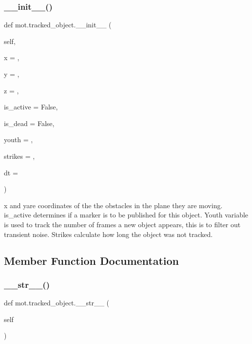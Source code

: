 \subsubsection{\texorpdfstring{\+\_\+\+\_\+init\+\_\+\+\_\+()}{\_\_init\_\_()}}
{\footnotesize\ttfamily def mot.\+tracked\+\_\+object.\+\_\+\+\_\+init\+\_\+\+\_\+ (\begin{DoxyParamCaption}\item[{}]{self,  }\item[{}]{x = {},  }\item[{}]{y = {},  }\item[{}]{z = {},  }\item[{}]{is\+\_\+active = {\ttfamily False},  }\item[{}]{is\+\_\+dead = {\ttfamily False},  }\item[{}]{youth = {},  }\item[{}]{strikes = {},  }\item[{}]{dt = {} }\end{DoxyParamCaption})}

\begin{DoxyVerb}x and yare coordinates of the the obstacles in the plane they are moving. is_active determines if a marker is to be published for this object.
Youth variable is used to track the number of frames a new object appears, this is to filter out transient noise. Strikes calculate how long the object was not tracked.
\end{DoxyVerb}
 

\subsection{Member Function Documentation}
\mbox{\label{classmot_1_1tracked__object_a85d7a4f4ea22ab10a426b344cc5fa827}} 
\subsubsection{\texorpdfstring{\+\_\+\+\_\+str\+\_\+\+\_\+()}{\_\_str\_\_()}}
{\footnotesize\ttfamily def mot.\+tracked\+\_\+object.\+\_\+\+\_\+str\+\_\+\+\_\+ (\begin{DoxyParamCaption}\item[{}]{self }\end{DoxyParamCaption})}

